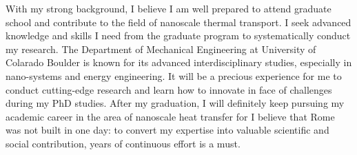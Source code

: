 \documentclass[a4paper,10pt]{article}
\begin{document}
\begin{spacing}{1.5}
With my strong background, I believe I am well prepared to attend graduate school and contribute to the field of nanoscale thermal transport. I seek advanced knowledge and skills I need from the graduate program to systematically conduct my research. The Department of Mechanical Engineering at University of Colarado Boulder is known for its advanced interdisciplinary studies, especially in nano-systems and energy engineering. It will be a precious experience for me to conduct cutting-edge research and learn how to innovate in face of challenges during my PhD studies. After my graduation, I will definitely keep pursuing my academic career in the area of nanoscale heat transfer for I believe that Rome was not built in one day: to convert my expertise into valuable scientific and social contribution, years of continuous effort is a must.\\

\end{spacing}
\end{document}
